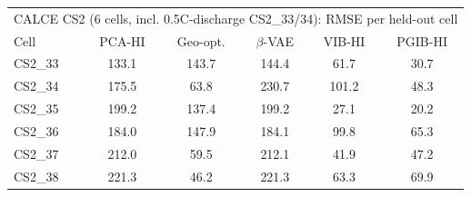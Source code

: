 \begin{tabular}{l c c c c c}
\hline
\multicolumn{6}{l}{CALCE CS2 (6 cells, incl. 0.5C-discharge CS2\_33/34): RMSE per held-out cell}\\
 Cell & PCA-HI & Geo-opt. & $\beta$-VAE & VIB-HI & PGIB-HI \\
\hline
CS2\_33 & 133.1 & 143.7 & 144.4 & 61.7 & 30.7 \\
CS2\_34 & 175.5 & 63.8 & 230.7 & 101.2 & 48.3 \\
CS2\_35 & 199.2 & 137.4 & 199.2 & 27.1 & 20.2 \\
CS2\_36 & 184.0 & 147.9 & 184.1 & 99.8 & 65.3 \\
CS2\_37 & 212.0 & 59.5 & 212.1 & 41.9 & 47.2 \\
CS2\_38 & 221.3 & 46.2 & 221.3 & 63.3 & 69.9 \\
\hline
\end{tabular}
